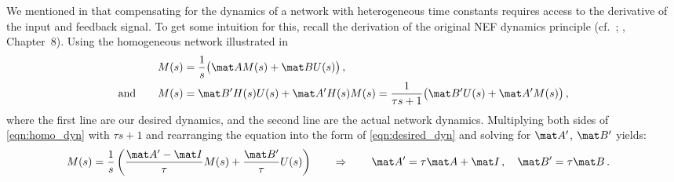 We mentioned in  that compensating for the dynamics of a network with heterogeneous time constants requires access to the derivative of the input and feedback signal.
To get some intuition for this, recall the derivation of the original NEF dynamics principle (cf.~; \cite{eliasmith2003neural}, Chapter~8).
Using the homogeneous network illustrated in 
\begin{align}
	M(s) &= \frac{1}{s} \bigl( \mat A M(s) + \mat B U(s) \bigr) \,, \label{eqn:desired_dyn}\\
	\text{and} \quad\quad M(s) &= \mat B' H(s) U(s) + \mat A' H(s) M(s) = \frac{1}{\tau s + 1} \bigl( \mat B' U(s) + \mat A' M(s) \bigr) \label{eqn:homo_dyn}\,,
\end{align}
where the first line are our desired dynamics, and the second line are the actual network dynamics.
Multiplying both sides of \cref{eqn:homo_dyn} with $\tau s + 1$ and rearranging the equation into the form of \cref{eqn:desired_dyn} and solving for $\mat A'$, $\mat B'$ yields:
\begin{align*}
	M(s) &= \frac{1}{s} \left( \frac{\mat A' - \mat I}{\tau} M(s) +  \frac{\mat B'}{\tau}  U(s) \right) \quad\quad \Rightarrow \quad\quad \mat A' = \tau \mat A + \mat I \,, \quad \mat B' = \tau \mat B \,.
\end{align*}

